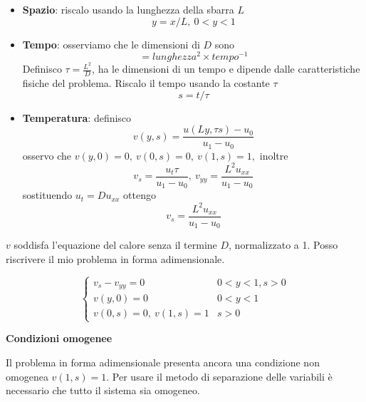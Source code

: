 \documentclass[10pt,a4paper,twoside,openright]{book}
\begin{document}
\begin{itemize}
\item \textbf{Spazio}: riscalo usando la lunghezza della sbarra $\displaystyle L$ \begin{equation*}
y=x/L,\ 0< y< 1
\end{equation*}
\item \textbf{Tempo}: osserviamo che le dimensioni di $\displaystyle D$ sono\begin{equation*}
[ D] =lunghezza^{2} \times tempo^{-1}
\end{equation*}Definisco $\displaystyle \tau =\frac{L^{2}}{D}$, ha le dimensioni di un tempo e dipende dalle caratteristiche fisiche del problema. Riscalo il tempo usando la costante $\displaystyle \tau $\begin{equation*}
s=t/\tau 
\end{equation*}
\item \textbf{Temperatura}: definisco\begin{equation*}
v(y,s) =\frac{u(Ly,\tau s) -u_{0}}{u_{1} -u_{0}}
\end{equation*}osservo che $\displaystyle v(y,0) =0,\ v(0,s) =0,\ v(1,s) =1,$ inoltre\begin{equation*}
v_{s} =\frac{u_{t} \tau }{u_{1} -u_{0}},\ v_{yy} =\frac{L^{2} u_{xx}}{u_{1} -u_{0}}
\end{equation*}sostituendo $\displaystyle u_{t} =Du_{xx}$ ottengo\begin{equation*}
v_{s} =\frac{L^{2} u_{xx}}{u_{1} -u_{0}}
\end{equation*}
\end{itemize}
$\displaystyle v$ soddisfa l'equazione del calore senza il termine $\displaystyle D$, normalizzato a 1. Posso riscrivere il mio problema in forma adimensionale.

\begin{equation*}
\begin{cases}
v_{s} -v_{yy} =0 & 0< y< 1,s >0\\
v(y,0) =0 & 0< y< 1\\
v(0,s) =0,\ v(1,s) =1 & s >0
\end{cases}
\end{equation*}



\textbf{Condizioni omogenee}

Il problema in forma adimensionale presenta ancora una condizione non omogenea $\displaystyle v(1,s) =1$. Per usare il metodo di separazione delle variabili è necessario che tutto il sistema sia omogeneo. 
\end{document}
